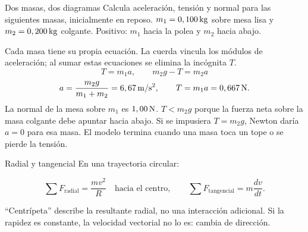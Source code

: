 \documentclass[11pt,a4paper]{article}
\begin{document}
\begin{examplebox}{Dos masas, dos diagramas}
 Calcula aceleraci\'on, tensi\'on y normal para las siguientes masas, inicialmente en reposo.
$m_1=0,100\,\mathrm{kg}$ sobre mesa lisa y $m_2=0,200\,\mathrm{kg}$ colgante. Positivo: $m_1$ hacia la polea y $m_2$ hacia abajo.
\solutionblock
\begin{center}
\end{center}
 Cada masa tiene su propia ecuaci\'on. La cuerda vincula los
m\'odulos de aceleraci\'on; al sumar estas ecuaciones se elimina la inc\'ognita $T$.
\[
T=m_1a,\qquad m_2g-T=m_2a
\]
\[
a=\frac{m_2g}{m_1+m_2}=6,67\,\mathrm{m/s^2},\qquad T=m_1a=0,667\,\mathrm{N}.
\]
 La normal de la mesa sobre $m_1$ es $1,00\,\mathrm{N}$. $T<m_2g$ porque la fuerza neta sobre la masa colgante debe apuntar hacia abajo.
Si se impusiera $T=m_2g$, Newton dar\'ia $a=0$ para esa masa.
El modelo termina cuando una masa toca un tope o se pierde la tensi\'on.
\end{examplebox}



\begin{lessoncard}{Radial y tangencial}
En una trayectoria circular:
\begin{formulabox}
\[
\sum F_{\mathrm{radial}}=\frac{mv^2}{R}\quad\text{hacia el centro},\qquad
\sum F_{\mathrm{tangencial}}=m\frac{dv}{dt}.
\]
\end{formulabox}
``Centr\'ipeta'' describe la resultante radial, no una interacci\'on adicional. Si la rapidez es constante, la velocidad vectorial no lo es: cambia de direcci\'on.
\end{lessoncard}
\end{document}
